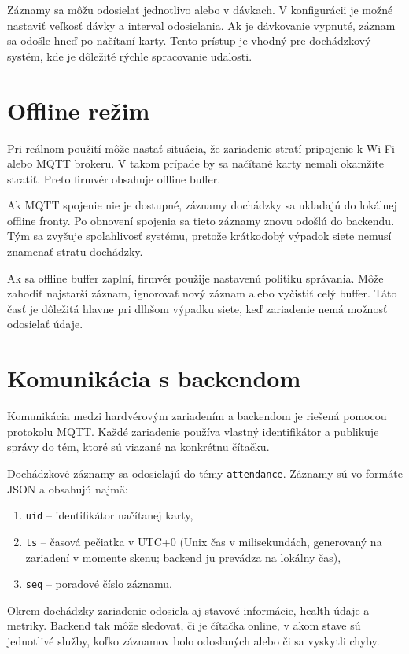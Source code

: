Záznamy sa môžu odosielať jednotlivo alebo v dávkach. V konfigurácii je možné nastaviť veľkosť dávky a interval odosielania. Ak je dávkovanie vypnuté, záznam sa odošle hneď po načítaní karty. Tento prístup je vhodný pre dochádzkový systém, kde je dôležité rýchle spracovanie udalosti.

\section{Offline režim}
\label{subsec:hardware-offline-mode}

Pri reálnom použití môže nastať situácia, že zariadenie stratí pripojenie k Wi-Fi alebo MQTT brokeru. V takom prípade by sa načítané karty nemali okamžite stratiť. Preto firmvér obsahuje offline buffer.

Ak MQTT spojenie nie je dostupné, záznamy dochádzky sa ukladajú do lokálnej offline fronty. Po obnovení spojenia sa tieto záznamy znovu odošlú do backendu. Tým sa zvyšuje spoľahlivosť systému, pretože krátkodobý výpadok siete nemusí znamenať stratu dochádzky.

Ak sa offline buffer zaplní, firmvér použije nastavenú politiku správania. Môže zahodiť najstarší záznam, ignorovať nový záznam alebo vyčistiť celý buffer. Táto časť je dôležitá hlavne pri dlhšom výpadku siete, keď zariadenie nemá možnosť odosielať údaje.

\section{Komunikácia s backendom}
\label{subsec:hardware-backend-communication}

Komunikácia medzi hardvérovým zariadením a backendom je riešená pomocou protokolu MQTT. Každé zariadenie používa vlastný identifikátor a publikuje správy do tém, ktoré sú viazané na konkrétnu čítačku.

Dochádzkové záznamy sa odosielajú do témy \texttt{attendance}. Záznamy sú vo formáte JSON a obsahujú najmä:
\begin{enumerate}
    \item \texttt{uid} -- identifikátor načítanej karty,
    \item \texttt{ts} -- časová pečiatka v UTC+0 (Unix čas v milisekundách, generovaný na zariadení v momente skenu; backend ju prevádza na lokálny čas),
    \item \texttt{seq} -- poradové číslo záznamu.
\end{enumerate}

Okrem dochádzky zariadenie odosiela aj stavové informácie, health údaje a metriky. Backend tak môže sledovať, či je čítačka online, v akom stave sú jednotlivé služby, koľko záznamov bolo odoslaných alebo či sa vyskytli chyby.

